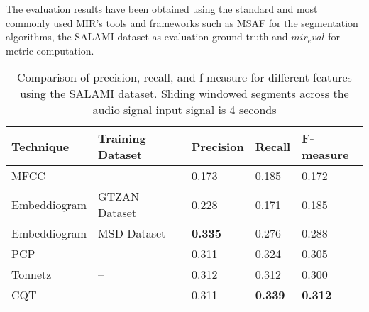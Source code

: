 
The evaluation results have been obtained using the standard and most commonly used MIR's tools and frameworks such as MSAF \cite{NietoMSAF:FRAMEWORK} for the segmentation algorithms, the SALAMI dataset \cite{Smith2011DESIGNANNOTATIONS} as evaluation ground truth and $mir_eval$ \cite{RaffelMir_eval:METRICS} for metric computation.


\begin{table}[h]
\centering
\begin{tabularx}{\textwidth}{|X|X|X|X|X|}
\hline
\textbf{Technique} & \textbf{Training Dataset} & \textbf{Precision} & \textbf{Recall} & \textbf{F-measure} \\
\hline
MFCC & -- & 0.173 & 0.185 & 0.172 \\
\hline
Embeddiogram & GTZAN Dataset & 0.228 & 0.171 & 0.185 \\
\hline
Embeddiogram & MSD Dataset & \textbf{0.335} & 0.276 & 0.288 \\
\hline
PCP & -- & 0.311 & 0.324 & 0.305 \\
\hline
Tonnetz & -- & 0.312 & 0.312 & 0.300 \\
\hline
CQT & -- & 0.311 & \textbf{0.339} & \textbf{0.312} \\
\hline
\end{tabularx}
\caption[Comparison of precision, recall, and f-measure for different audio features]{Comparison of precision, recall, and f-measure for different features using the SALAMI dataset. Sliding windowed segments across the audio signal input signal is 4 seconds}
\label{tab:comparison}
\end{table}



